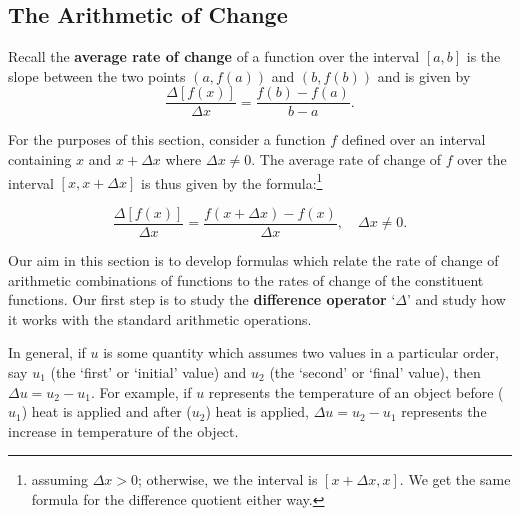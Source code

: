 \subsection{The Arithmetic of Change}
\label{rocarithmetic}

Recall the \textbf{average rate of change} of a function over the interval $[a,b]$  is the slope between the two points $(a, f(a))$ and $(b, f(b))$ and is given by \[ \dfrac{\Delta[f(x)]}{\Delta x} = \dfrac{f(b)-f(a)}{b-a}.\]

\medskip  



For the purposes of this section, consider a function $f$ defined over an interval containing $x$ and $x+\Delta x$ where $\Delta x \neq 0$. The average rate of change of $f$ over the interval $[x,x+\Delta x]$ is thus given by the formula:\footnote{assuming $\Delta x>0$;  otherwise, we  the interval is $[x+\Delta x, x]$.  We get the same formula for the difference quotient either way.}

\[ \dfrac{\Delta[f(x)]}{\Delta x} = \dfrac{f(x+\Delta x)-f(x)}{\Delta x}, \quad \Delta x \neq 0.\]

\medskip

Our aim in this section is to develop formulas which relate the rate of change of arithmetic combinations of functions to the rates of change of the constituent functions.   Our first step is to study the \textbf{difference operator}  `$\Delta$'  and study how it works with the standard arithmetic operations.  

\medskip

In general, if $u$ is some quantity which assumes two values in a particular order, say $u_{1}$ (the `first' or `initial' value) and $u_{2}$ (the `second' or `final' value), then $\Delta u = u_{2} - u_{1}$.  For example, if $u$ represents the temperature of an object before ($u_{1}$) heat is applied and after ($u_{2}$) heat is applied,  $\Delta u = u_{2} - u_{1}$ represents the increase in temperature of the object.

